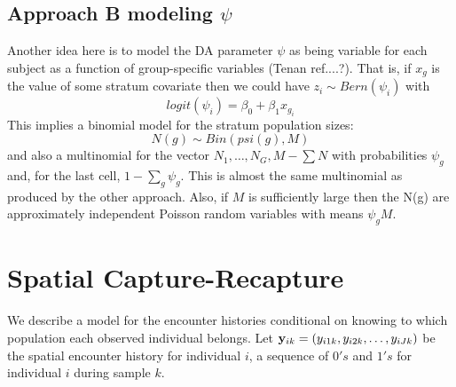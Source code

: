 \subsection{Approach B modeling $\psi$}

Another idea here is to model the DA parameter $\psi$ as being
variable for each subject as a function of group-specific variables
(Tenan ref....?). That is, if $x_{g}$ is the value of some stratum
covariate then we could have $z_{i} \sim Bern( \psi_{i})$
with
\[
 logit(\psi_{i}) = \beta_0 + \beta_1  x_{g_{i}}
\]
This implies a binomial model for the stratum population sizes:
\[
N(g) \sim Bin(psi(g), M)
\] 
and also a multinomial for the vector 
$N_{1}, \ldots, N_{G}, M-\sum N$ with probabilities
$\psi_{g}$ and, for the last cell, $1-\sum_{g} \psi_{g}$. This is
almost the same multinomial as produced by the other approach.
Also, if $M$ is sufficiently large then the N(g) are approximately
independent Poisson random variables with means $\psi_{g} M$.



\section{Spatial Capture-Recapture}



We describe a model for the encounter histories conditional on knowing to 
which population each observed individual belongs.  Let ${\bf y}_{ik} =
(y_{i1k},y_{i2k},\ldots,y_{iJk})$ be the spatial encounter history for
individual $i$, a sequence of $0's$ and $1's$ for individual $i$
during sample $k$.  

